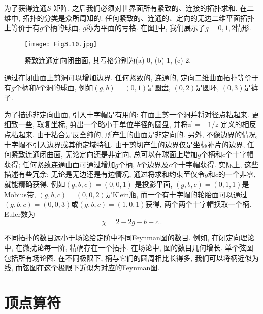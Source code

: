 为了获得连通$S$-矩阵, 之后我们必须对世界面所有紧致的、连接的拓扑求和. 在二维中, 拓扑的分类是众所周知的. 任何紧致的、连通的、定向的无边二维平面拓扑上等价于有$g$个柄的球面, $g$称为平面的亏格. 在图\ref{Fig3.10}中, 我们展示了$g=0,1,2$情形.

\begin{figure}[h]
	\begin{center}
		\texttt{[image: Fig3.10.jpg]}\\
		\caption{紧致连通定向闭曲面, 其亏格分别为(a) 0, (b) 1, (c) 2.}\label{Fig3.10}
	\end{center}
\end{figure}

通过在闭曲面上剪洞可以增加边界. 任何紧致的, 连通的, 定向二维曲面拓扑等价于有$g$个柄和$b$个洞的球面, 例如$(g,b)=(0,1)$是圆盘, $(0,2)$是圆环, $(0,3)$是裤子. 

为了描述非定向曲面, 引入十字帽是有用的: 在面上剪一个洞并将对径点粘起来. 更细致一些, 取复坐标, 剪出一个略小于单位半径的圆盘, 并将$z^{\prime}=-1 / \bar{z}$ 定义的相反点粘起来. 由于粘合是反全纯的, 所产生的曲面是非定向的. 另外, 不像边界的情况, 十字帽不引入边界或其他定域特征. 由于剪切产生的边界仅是坐标补片的边界, 任何紧致连通闭曲面, 无论定向还是非定向, 总可以在球面上增加$g$个柄和$c$个十字帽获得; 任何紧致连通曲面可通过增加$g$个柄, $b$个边界及$c$个十字帽获得. 实际上, 这些描述有些冗余: 无论是无边还是有边情况, 通过将求和约束至仅令$g$和$c$的一个非零, 就能精确获得. 例如$(g, b, c) = (0, 0, 1)$ 是投影平面, $(g, b, c) = (0, 1, 1)$是Mobius带, $(g, b, c) = (0, 0, 2)$是Klein瓶, 而一个有十字帽的轮胎面可以通过$(g, b, c) = (0, 0, 3)$或$(g, b, c) = (1, 0, 1)$获得, 两个两个十字帽换取一个柄.  Euler数为
\begin{equation}
\chi=2-2 g-b-c \:. \label{3.5.6}
\end{equation}

不同拓扑的数目远小于场论给定阶中不同Feynman图的数目. 例如, 在闭定向理论中, 在微扰论每一阶, 精确存在一个拓扑. 在场论中, 图的数目几何增长. 单个弦图包括所有场论图. 在不同极限下, 柄与它们的圆周相比长得多, 我们可以将柄近似为线, 而弦图在这个极限下近似为对应的Feynman图.


\section{\texorpdfstring{顶点算符}{3.6 Vertex operators}} \label{sec:3.6}

